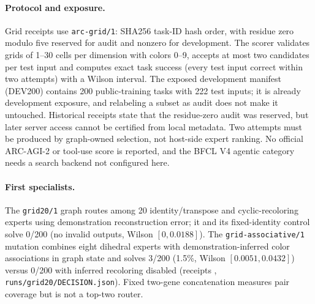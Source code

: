 \documentclass[11pt]{article}
\begin{document}
\paragraph{Protocol and exposure.} Grid receipts use \texttt{arc-grid/1}: SHA256 task-ID hash order,
with residue zero modulo five reserved for audit and nonzero for development. The scorer validates
grids of 1--30 cells per dimension with colors 0--9, accepts at most two candidates per test input
and computes exact task success (every test input correct within two attempts) with a Wilson
interval. The exposed development manifest (DEV200) contains 200 public-training tasks with 222
test inputs; it is already development exposure, and relabeling a subset as audit does not make it
untouched. Historical receipts state that the residue-zero audit was reserved, but later server
access cannot be certified from local metadata. Two attempts must be produced by graph-owned
selection, not host-side expert ranking. No official ARC-AGI-2 or tool-use score is reported, and
the BFCL V4 agentic category needs a search backend not configured here.

\paragraph{First specialists.} The \texttt{grid20/1} graph routes among 20 identity/transpose and
cyclic-recoloring experts using demonstration reconstruction error; it and its fixed-identity
control solve 0/200 (no invalid outputs, Wilson $[0,0.0188]$). The \texttt{grid-associative/1}
mutation combines eight dihedral experts with demonstration-inferred color associations in graph
state and solves 3/200 (1.5\%, Wilson $[0.0051,0.0432]$) versus 0/200 with inferred recoloring
disabled (receipts , \texttt{runs/grid20/DECISION.json}).
Fixed two-gene concatenation measures pair coverage but is not a top-two router.
\end{document}
